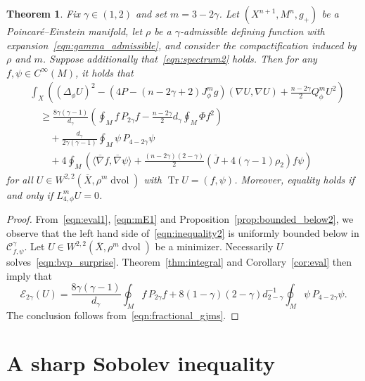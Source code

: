 \documentclass{amsart}
\newtheorem{thm}{Theorem}[section]
\theoremstyle{definition}
\theoremstyle{remark}
\numberwithin{equation}{section}
\begin{document}
\begin{thm}
\label{thm:inequality2}
 Fix $\gamma\in(1,2)$ and set $m=3-2\gamma$.  Let $(X^{n+1},M^n,g_+)$ be a Poincar\'e--Einstein manifold, let $\rho$ be a $\gamma$-admissible defining function with expansion~\eqref{eqn:gamma_admissible}, and consider the compactification induced by $\rho$ and $m$.  Suppose additionally that~\eqref{eqn:spectrum2} holds.  Then for any $f,\psi\in C^\infty(M)$, it holds that
 \begin{equation}
  \label{eqn:inequality2}
  \begin{split}
   & \int_X\left(\left(\Delta_\phi U\right)^2 - \left(4P-(n-2\gamma+2)J_\phi^mg\right)(\nabla U,\nabla U) + \frac{n-2\gamma}{2}Q_\phi^m U^2\right) \\
   & \quad \geq \frac{8\gamma(\gamma-1)}{d_\gamma}\left(\oint_M f\,P_{2\gamma}f - \frac{n-2\gamma}{2}d_\gamma\oint_M \Phi f^2\right) \\
   & \qquad + \frac{d_\gamma}{2\gamma(\gamma-1)}\oint_M \psi\,P_{4-2\gamma}\psi \\
   & \qquad + 4\oint_M \left( {\langle}{\overline{\nabla}} f,{\overline{\nabla}}\psi{\rangle} + \frac{(n-2\gamma)(2-\gamma)}{2}\left({\overline{J}}+4(\gamma-1)\rho_2\right)f\psi\right)
  \end{split}
 \end{equation}
 for all $U\in W^{2,2}({\overline{X}},\rho^m\operatorname{dvol})$ with $\operatorname{Tr} U=(f,\psi)$.  Moreover, equality holds if and only if $L_{4,\phi}^mU=0$.
\end{thm}

\begin{proof}
 From~\eqref{eqn:eval1}, \eqref{eqn:mE1} and Proposition~\ref{prop:bounded_below2}, we observe that the left hand side of~\eqref{eqn:inequality2} is uniformly bounded below in ${\mathcal{C}}_{f,\psi}^\gamma$.  Let $U\in W^{2,2}({\overline{X}},\rho^m\operatorname{dvol})$ be a minimizer.  Necessarily $U$ solves~\eqref{eqn:bvp_surprise}.  Theorem~\ref{thm:integral} and Corollary~\ref{cor:eval} then imply that
 \[ {\mathcal{E}}_{2\gamma}(U) = \frac{8\gamma(\gamma-1)}{d_\gamma}\oint_M f\,P_{2\gamma}f + 8(1-\gamma)(2-\gamma)d_{2-\gamma}^{-1}\oint_M \psi\,P_{4-2\gamma}\psi . \]
 The conclusion follows from~\eqref{eqn:fractional_gjms}.
\end{proof}

\section{A sharp Sobolev inequality}
\label{sec:sobolev}
\end{document}
